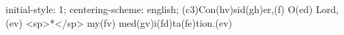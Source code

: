 initial-style: 1;
centering-scheme: english;
(c3)Con(hv)sid(gh)er,(f) O(ed) Lord,(ev) <sp>*</sp> my(fv) med(gv)i(fd)ta(fe)tion.(ev)
